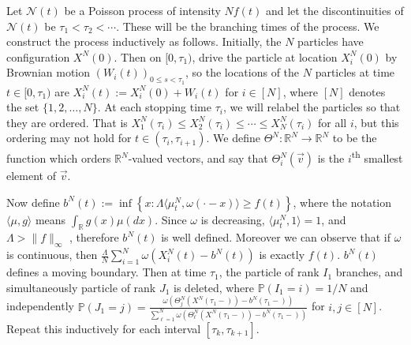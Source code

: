\documentclass[10pt,a4paper]{amsart}
\newcommand{\B}[1]{\mathbb{#1}}
\newcommand{\C}[1]{\mathcal{#1}}
\begin{document}
Let $\C{N}(t)$ be a Poisson process of intensity $Nf(t)$ and let the discontinuities of $\C{N}(t)$ be $\tau_1<\tau_2<\cdots$. These will be the branching times of the process. We construct the process inductively as follows. Initially, the $N$ particles have configuration $X^N(0)$. Then on $[0,\tau_1)$, drive the particle at location $X_i^N(0)$ by Brownian motion $(W_i(t))_{0\leq s<\tau_1}$, so the locations of the $N$ particles at time $t\in [0,\tau_1)$ are $X_i^N(t):=X_i^N(0)+W_i(t)$ for $i\in [N]$, where $[N]$ denotes the set $\{1,2,\ldots,N\}$. At each stopping time $\tau_i$, we will relabel the particles so that they are ordered. That is $X_1^N(\tau_i)\leq X_2^N(\tau_i)\leq \cdots \leq X_N^N(\tau_i)$ for all $i$, but this ordering may not hold for $t\in (\tau_i,\tau_{i+1})$. We define $\Theta^N:\B{R}^N\to\B{R}^N$ to be the function which orders $\B{R}^N$-valued vectors, and say that $\Theta^N_i(\vec{v})$ is the $i$\textsuperscript{th} smallest element of $\vec{v}$.

Now define $b^N(t):=\inf\left\{x:\Lambda \langle \mu_t^N,\omega(\cdot-x)\rangle \geq f(t)\right\}$, where the notation $\langle \mu,g\rangle$ means $\int_\B{R} g(x)\mu(dx)$. Since $\omega$ is decreasing, $\langle \mu_t^N,1\rangle=1$, and $\Lambda > \|f\|_\infty$%
, therefore $b^N(t)$ is well defined. Moreover we can observe that if $\omega$ is continuous, then $\frac{\Lambda}{N} \sum_{i=1}^N \omega(X_i^N(t)-b^N(t))$ is exactly $f(t)$. $b^N(t)$ defines a moving boundary. %
Then at time $\tau_1$, the particle of rank $I_1$ branches, and simultaneously particle of rank $J_1$ is deleted, where $\B{P}(I_1=i)=1/N$ and independently $\B{P}(J_1=j)=\frac{\omega(\Theta^N_j(X^N(\tau_1-))-b^N(\tau_1-))}{\sum_{\ell=1}^N \omega(\Theta^N_\ell(X^N(\tau_1-))-b^N(\tau_1-))}$%
for $i,j\in [N]$. Repeat this inductively for each interval $[\tau_k,\tau_{k+1}]$. 

\end{document}
